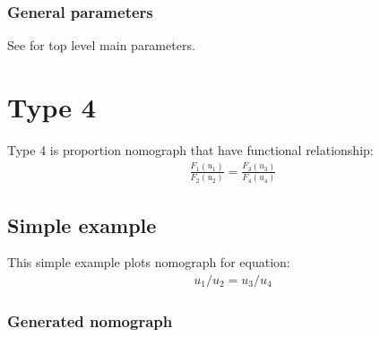 \documentclass[a4paper,11pt,english]{sphinxmanual}
\begin{document}
\subsubsection{General parameters}
\label{\detokenize{types/types:id11}}
See {\hyperref[\detokenize{main_params:main-params}]{}} for top level main parameters.


\section{Type 4}
\label{\detokenize{types/types:type-4}}\label{\detokenize{types/types:type4-ref}}
Type 4 is proportion nomograph that have functional relationship:
\begin{equation*}
\begin{split}\frac{F_1(u_1)}{F_2(u_2)} = \frac{F_3(u_3)}{F_4(u_4)}\end{split}
\end{equation*}

\subsection{Simple example}
\label{\detokenize{types/types:id12}}
This simple example plots nomograph for equation:
\begin{equation*}
\begin{split}u_1 / u_2 = u_3 / u_4\end{split}
\end{equation*}

\subsubsection{Generated nomograph}
\label{\detokenize{types/types:id13}}
\noindent{}
\end{document}
